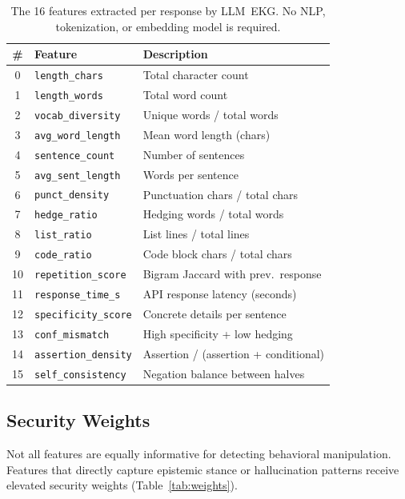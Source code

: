 \documentclass[11pt,twocolumn]{article}
\begin{document}
\begin{table}[H]
\centering\small
\caption{The 16 features extracted per response by LLM~EKG. No NLP, tokenization, or embedding model is required.}
\label{tab:features}
\begin{tabular}{clp{3.8cm}}
\toprule
\textbf{\#} & \textbf{Feature} & \textbf{Description} \\
\midrule
0 & \texttt{length\_chars} & Total character count \\
1 & \texttt{length\_words} & Total word count \\
2 & \texttt{vocab\_diversity} & Unique words / total words \\
3 & \texttt{avg\_word\_length} & Mean word length (chars) \\
4 & \texttt{sentence\_count} & Number of sentences \\
5 & \texttt{avg\_sent\_length} & Words per sentence \\
6 & \texttt{punct\_density} & Punctuation chars / total chars \\
7 & \texttt{hedge\_ratio} & Hedging words / total words \\
8 & \texttt{list\_ratio} & List lines / total lines \\
9 & \texttt{code\_ratio} & Code block chars / total chars \\
10 & \texttt{repetition\_score} & Bigram Jaccard with prev.\ response \\
11 & \texttt{response\_time\_s} & API response latency (seconds) \\
\midrule
12 & \texttt{specificity\_score} & Concrete details per sentence \\
13 & \texttt{conf\_mismatch} & High specificity + low hedging \\
14 & \texttt{assertion\_density} & Assertion / (assertion + conditional) \\
15 & \texttt{self\_consistency} & Negation balance between halves \\
\bottomrule
\end{tabular}
\end{table}

\subsection{Security Weights}
\label{sec:weights}

Not all features are equally informative for detecting behavioral manipulation.
Features that directly capture epistemic stance or hallucination patterns receive elevated security weights (Table~\ref{tab:weights}).
\end{document}
